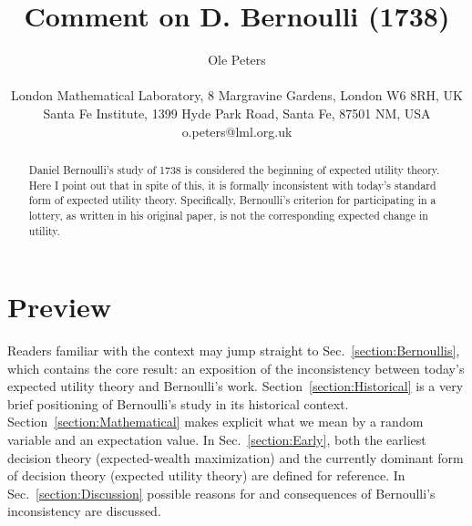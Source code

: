 \documentclass[pdftex]{article}
\newcommand{\secref}[1]{Sec.~\ref{section:#1}}
\newcommand{\Secref}[1]{Section~\ref{section:#1}}
\begin{document}

\title{Comment on D. Bernoulli (1738)}
\author{Ole Peters\\
\\
{\small London Mathematical Laboratory, 8 Margravine Gardens, London W6 8RH, UK}\\
{\small Santa Fe Institute, 1399 Hyde Park Road, Santa Fe, 87501 NM, USA}\\
{\small o.peters@lml.org.uk}}
\maketitle


\begin{abstract}
Daniel Bernoulli's study of 1738 \cite{Bernoulli1738} is considered the beginning of expected utility theory. Here I point out that in spite of this, it is formally inconsistent with today's standard form of expected utility theory. Specifically, Bernoulli's criterion for participating in a lottery, as written in his original paper, is not the corresponding expected change in utility. 
\end{abstract}

\section{Preview}
Readers familiar with the context may jump straight to \secref{Bernoullis},  which contains the core result: an exposition of the inconsistency between today's expected utility theory and Bernoulli's work. \Secref{Historical} is a very brief positioning of Bernoulli's study in its historical context. \Secref{Mathematical} makes explicit what we mean by a random variable and an expectation value. In \secref{Early}, both the earliest decision theory (expected-wealth maximization) and the currently dominant form of decision theory (expected utility theory) are defined for reference. In \secref{Discussion} possible reasons for and consequences of Bernoulli's inconsistency are discussed.
 
\end{document}
